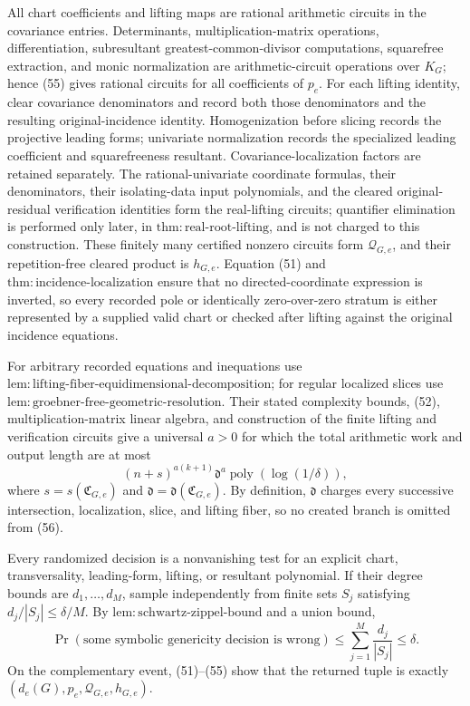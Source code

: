 All chart coefficients and lifting maps are rational arithmetic circuits in the covariance entries.  Determinants, multiplication-matrix operations, differentiation, subresultant greatest-common-divisor computations, squarefree extraction, and monic normalization are arithmetic-circuit operations over \(K_G\); hence (55) gives rational circuits for all coefficients of \(p_e\).  For each lifting identity, clear covariance denominators and record both those denominators and the resulting original-incidence identity.  Homogenization before slicing records the projective leading forms; univariate normalization records the specialized leading coefficient and squarefreeness resultant.  Covariance-localization factors are retained separately.  The rational-univariate coordinate formulas, their denominators, their isolating-data input polynomials, and the cleared original-residual verification identities form the real-lifting circuits; quantifier elimination is performed only later, in \(\mathrm{thm:real\mbox{-}root\mbox{-}lifting}\), and is not charged to this construction.  These finitely many certified nonzero circuits form \(\mathcal Q_{G,e}\), and their repetition-free cleared product is \(h_{G,e}\).  Equation (51) and \(\mathrm{thm:incidence\mbox{-}localization}\) ensure that no directed-coordinate expression is inverted, so every recorded pole or identically zero-over-zero stratum is either represented by a supplied valid chart or checked after lifting against the original incidence equations.

For arbitrary recorded equations and inequations use \(\mathrm{lem:lifting\mbox{-}fiber\mbox{-}equidimensional\mbox{-}decomposition}\); for regular localized slices use \(\mathrm{lem:groebner\mbox{-}free\mbox{-}geometric\mbox{-}resolution}\).  Their stated complexity bounds, (52), multiplication-matrix linear algebra, and construction of the finite lifting and verification circuits give a universal \(a>0\) for which the total arithmetic work and output length are at most
\[
 (n+s)^{a(k+1)}\mathfrak d^a
 \operatorname{poly}(\log(1/\delta)),
\tag{56}
\]
where \(s=s(\mathfrak C_{G,e})\) and \(\mathfrak d=\mathfrak d(\mathfrak C_{G,e})\).  By definition, \(\mathfrak d\) charges every successive intersection, localization, slice, and lifting fiber, so no created branch is omitted from (56).

Every randomized decision is a nonvanishing test for an explicit chart, transversality, leading-form, lifting, or resultant polynomial.  If their degree bounds are \(d_1,\ldots,d_M\), sample independently from finite sets \(S_j\) satisfying \(d_j/|S_j|\leq\delta/M\).  By \(\mathrm{lem:schwartz\mbox{-}zippel\mbox{-}bound}\) and a union bound,
\[
 \Pr(\text{some symbolic genericity decision is wrong})
 \leq\sum_{j=1}^M\frac{d_j}{|S_j|}\leq\delta.
\tag{57}
\]
On the complementary event, (51)--(55) show that the returned tuple is exactly \((d_e(G),p_e,\mathcal Q_{G,e},h_{G,e})\).

